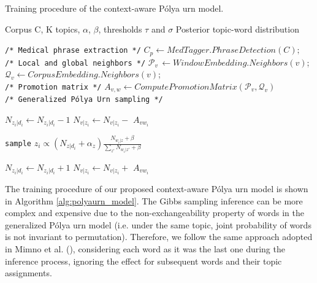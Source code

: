 \documentclass[letterpaper]{article}
\begin{document}
\begin{algorithm}[htb]
\begin{algorithmic}[1]
\caption{Training procedure of the context-aware P\'{o}lya urn model.}
\label{alg:polyaurn_model}
\Require Corpus C, K topics, $\alpha$, $\beta$, thresholds $\tau$ and $\sigma$
\Ensure Posterior topic-word distribution

\State \texttt{/* Medical phrase extraction */}
\State $C_p \leftarrow MedTagger.PhraseDetection(C);$ \\

\State  \texttt{/* Local and global neighbors */} 
	\State $\mathcal{P}_{v}\, \leftarrow  WindowEmbedding.Neighbors(v)$;
    \State $\mathcal{Q}_{v} \leftarrow  CorpusEmbedding.Neighbors(v)$;
\EndFor \\

\State \texttt{/* Promotion matrix */} 
\State $\mathit{A_{v,w}} \leftarrow ComputePromotionMatrix(\mathcal{P}_{v}, \mathcal{Q}_{v})$ \\

\State \texttt{/* Generalized P\'{o}lya Urn sampling */} 
{}

        \State $N_{z_i|d_i} \leftarrow N_{z_i|d_i} - 1 $
        	\State $N_{v|z_i} \leftarrow N_{v|z_i} -$ \textbf{\textit{$A_{vw_{i}}$}}
    	\EndFor
    \EndFor
    
	\State \texttt{sample} $z_i \propto (N_{z|d_i} + \alpha_z) \frac{N_{w_i|z} + \beta}{\sum_{z'}^{} N_{w_i|z'} + \beta}$
    
        \State $N_{z_i|d_i} \leftarrow N_{z_i|d_i} + 1 $
        	\State $N_{v|z_i} \leftarrow N_{v|z_i} +$ \textbf{\textit{$A_{vw_{i}}$}}  %
    	\EndFor
    \EndFor
\EndFor

\end{algorithmic}
\end{algorithm}

The training procedure of our proposed context-aware P\'{o}lya urn model is shown in Algorithm \ref{alg:polyaurn_model}. %
The Gibbs sampling inference can be more complex and expensive due to the non-exchangeability property of words in the generalized P\'{o}lya urn model (i.e. under the same topic, joint probability of words is not invariant to permutation). Therefore, we follow the same approach adopted in Mimno et al. (\citeyear{Mimno11}), considering each word as it was the last one during the inference process, ignoring the effect for subsequent words and their topic assignments. 
\end{document}
